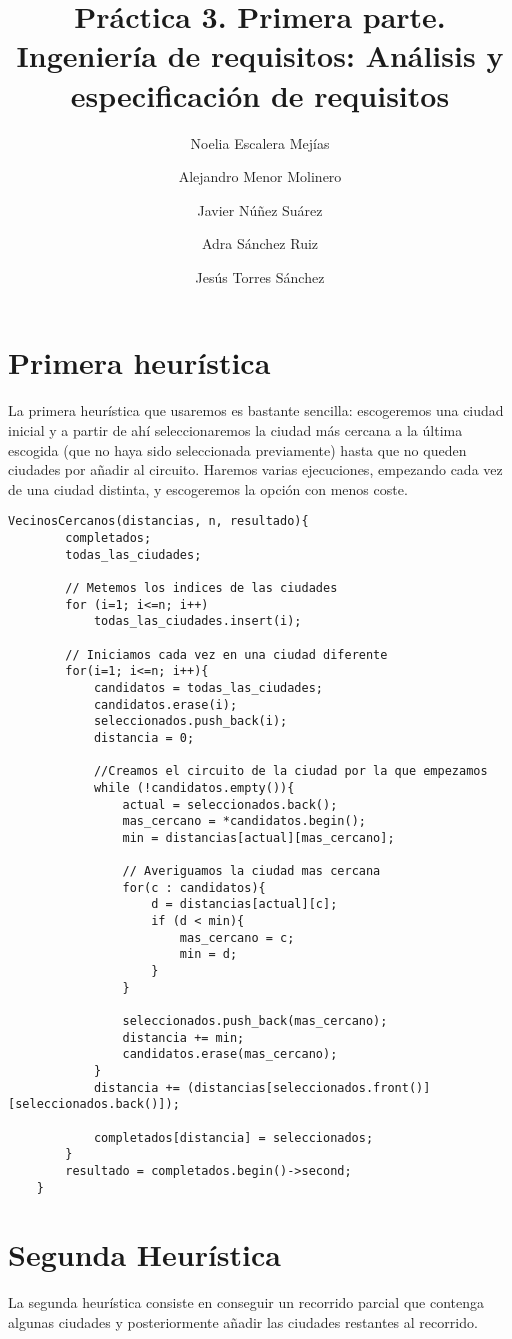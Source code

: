 \documentclass{article}
\title{Práctica 3. Primera parte. Ingeniería de requisitos: Análisis y especificación de requisitos}
\author{Noelia Escalera Mejías\\
	\and Alejandro Menor Molinero\\
	\and Javier Núñez Suárez\\
	\and Adra Sánchez Ruiz\\
	\and Jesús Torres Sánchez}
\begin{document}
	\maketitle
	
	\section{Primera heurística}
	La primera heurística que usaremos es bastante sencilla: escogeremos una ciudad inicial y a partir de ahí seleccionaremos la ciudad más cercana a la última escogida (que no haya sido seleccionada previamente) hasta que no queden ciudades por añadir al circuito. Haremos varias ejecuciones, empezando cada vez de una ciudad distinta, y escogeremos la opción con menos coste.
	
	\begin{lstlisting}[caption=Pseudocódigo de la primera heurística]
	VecinosCercanos(distancias, n, resultado){
		completados;
		todas_las_ciudades;
		
		// Metemos los indices de las ciudades
		for (i=1; i<=n; i++)
			todas_las_ciudades.insert(i);
			
		// Iniciamos cada vez en una ciudad diferente
		for(i=1; i<=n; i++){
			candidatos = todas_las_ciudades;
			candidatos.erase(i);
			seleccionados.push_back(i);
			distancia = 0;
			
			//Creamos el circuito de la ciudad por la que empezamos
			while (!candidatos.empty()){
				actual = seleccionados.back();
				mas_cercano = *candidatos.begin();
				min = distancias[actual][mas_cercano];
				
				// Averiguamos la ciudad mas cercana
				for(c : candidatos){
					d = distancias[actual][c];
					if (d < min){
						mas_cercano = c;
						min = d;
					}
				}
				
				seleccionados.push_back(mas_cercano);
				distancia += min;
				candidatos.erase(mas_cercano);
			}
			distancia += (distancias[seleccionados.front()][seleccionados.back()]);
			
			completados[distancia] = seleccionados;
		}
		resultado = completados.begin()->second;
	}
	\end{lstlisting}
	\section{Segunda Heurística}
	La segunda heurística consiste en conseguir un recorrido parcial que contenga algunas ciudades y posteriormente añadir las ciudades restantes al recorrido.
	
	\begin{lstlisting}[caption=Pseudocódigo de la segunda heurística]
	
	\end{lstlisting}
\end{document}
